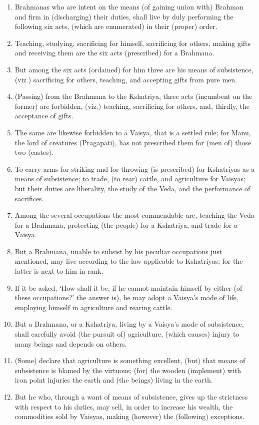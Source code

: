 \begin{enumerate}
\item Brahmanas who are intent on the means (of gaining union with) Brahman and firm in (discharging) their duties, shall live by duly performing the following six acts, (which are enumerated) in their (proper) order.
\item Teaching, studying, sacrificing for himself, sacrificing for others, making gifts and receiving them are the six acts (prescribed) for a Brahmana.
\item But among the six acts (ordained) for him three are his means of subsistence, (viz.) sacrificing for others, teaching, and accepting gifts from pure men.
\item (Passing) from the Brahmana to the Kshatriya, three acts (incumbent on the former) are forbidden, (viz.) teaching, sacrificing for others, and, thirdly, the acceptance of gifts.
\item The same are likewise forbidden to a Vaisya, that is a settled rule; for Manu, the lord of creatures (Pragapati), has not prescribed them for (men of) those two (castes).
\item To carry arms for striking and for throwing (is prescribed) for Kshatriyas as a means of subsistence; to trade, (to rear) cattle, and agriculture for Vaisyas; but their duties are liberality, the study of the Veda, and the performance of sacrifices.
\item Among the several occupations the most commendable are, teaching the Veda for a Brahmana, protecting (the people) for a Kshatriya, and trade for a Vaisya.
\item But a Brahmana, unable to subsist by his peculiar occupations just mentioned, may live according to the law applicable to Kshatriyas; for the latter is next to him in rank.
\item If it be asked, `How shall it be, if he cannot maintain himself by either (of these occupations?' the answer is), he may adopt a Vaisya's mode of life, employing himself in agriculture and rearing cattle.
\item But a Brahmana, or a Kshatriya, living by a Vaisya's mode of subsistence, shall carefully avoid (the pursuit of) agriculture, (which causes) injury to many beings and depends on others.
\item (Some) declare that agriculture is something excellent, (but) that means of subsistence is blamed by the virtuous; (for) the wooden (implement) with iron point injuries the earth and (the beings) living in the earth.
\item But he who, through a want of means of subsistence, gives up the strictness with respect to his duties, may sell, in order to increase his wealth, the commodities sold by Vaisyas, making (however) the (following) exceptions.

\end{enumerate}
